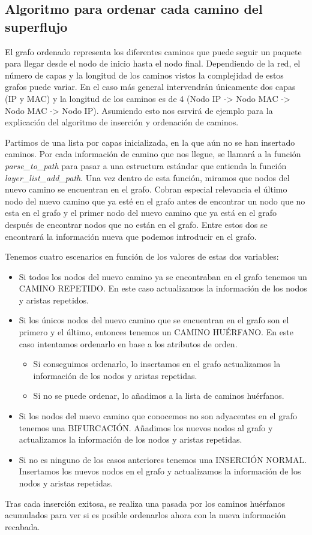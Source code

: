 \documentclass[twoside, 12pt]{epstfg}
\begin{document}
\subsection{Algoritmo para ordenar cada camino del superflujo}
El grafo ordenado representa los diferentes caminos que puede seguir un paquete para llegar desde el nodo de inicio hasta el nodo final. Dependiendo de la red, el número de capas y la longitud de los caminos vistos la complejidad de estos grafos puede variar. En el caso más general intervendrán únicamente dos capas (IP y MAC) y la longitud de los caminos es de 4 (Nodo IP -> Nodo MAC -> Nodo MAC -> Nodo IP). Asumiendo esto nos esrvirá de ejemplo para la explicación del algoritmo de inserción y ordenación de caminos.

Partimos de una lista por capas inicializada, en la que aún no se han insertado caminos. Por cada información de camino que nos llegue, se llamará a la función \textit{parse\_to\_path} para pasar a una estructura estándar que entienda la función \textit{layer\_list\_add\_path}. Una vez dentro de esta función, miramos que nodos del nuevo camino se encuentran en el grafo. Cobran especial relevancia el último nodo del nuevo camino que ya esté en el grafo antes de encontrar un nodo que no esta en el grafo y el primer nodo del nuevo camino que ya está en el grafo después de encontrar nodos  que no están en el grafo. Entre estos dos se encontrará la información nueva que podemos introducir en el grafo.

Tenemos cuatro escenarios en función de los valores de estas dos variables:
\begin{itemize}
    \item Si todos los nodos del nuevo camino ya se encontraban en el grafo tenemos un CAMINO REPETIDO. En este caso actualizamos la información de los nodos y aristas repetidos.
    \item Si los únicos nodos del nuevo camino que se encuentran en el grafo son el primero y el último, entonces tenemos un CAMINO HUÉRFANO. En este caso intentamos ordenarlo en base a los atributos de orden.
    \begin{itemize}
        \item Si conseguimos ordenarlo, lo insertamos en el grafo actualizamos la información de los nodos y aristas repetidas.
        \item Si no se puede ordenar, lo añadimos a la lista de caminos huérfanos.
    \end{itemize}
    \item Si los nodos del nuevo camino que conocemos no son adyacentes en el grafo tenemos una BIFURCACIÓN. Añadimos los nuevos nodos al grafo y actualizamos la información de los nodos y aristas repetidas.
    \item Si no es ninguno de los casos anteriores tenemos una INSERCIÓN NORMAL. Insertamos los nuevos nodos en el grafo y actualizamos la información de los nodos y aristas repetidas.
\end{itemize}
Tras cada inserción exitosa, se realiza una pasada por los caminos huérfanos acumulados para ver si es posible ordenarlos ahora con la nueva información recabada.
\end{document}
